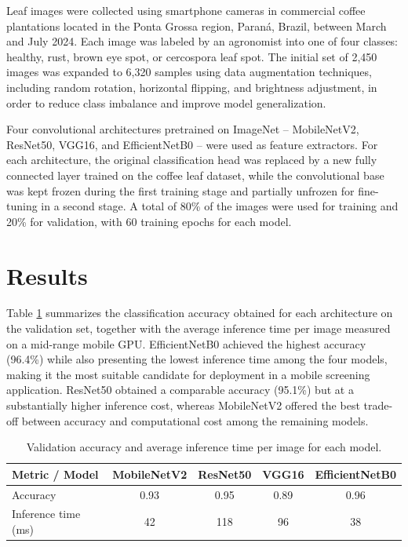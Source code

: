 \documentclass[11pt,a4paper]{article}
\begin{document}
Leaf images were collected using smartphone cameras in commercial
coffee plantations located in the Ponta Grossa region, Paran\'a,
Brazil, between March and July 2024. Each image was labeled by an
agronomist into one of four classes: healthy, rust, brown eye spot, or
cercospora leaf spot. The initial set of 2,450 images was expanded to
6,320 samples using data augmentation techniques, including random
rotation, horizontal flipping, and brightness adjustment, in order to
reduce class imbalance and improve model generalization.

Four convolutional architectures pretrained on ImageNet --
MobileNetV2, ResNet50, VGG16, and EfficientNetB0 -- were used as
feature extractors. For each architecture, the original classification
head was replaced by a new fully connected layer trained on the coffee
leaf dataset, while the convolutional base was kept frozen during the
first training stage and partially unfrozen for fine-tuning in a
second stage. A total of 80\% of the images were used for training and
20\% for validation, with 60 training epochs for each model.

\section{Results}

Table \ref{tab:exemplo} summarizes the classification accuracy obtained
for each architecture on the validation set, together with the average
inference time per image measured on a mid-range mobile GPU.
EfficientNetB0 achieved the highest accuracy (96.4\%) while also
presenting the lowest inference time among the four models, making it
the most suitable candidate for deployment in a mobile screening
application. ResNet50 obtained a comparable accuracy (95.1\%) but at a
substantially higher inference cost, whereas MobileNetV2 offered the
best trade-off between accuracy and computational cost among the
remaining models.

\begin{table}[htb]
  \centering
  \caption{Validation accuracy and average inference time per image for each model.}
  \label{tab:exemplo}
  \begin{tabular}{|l|c|c|c|c|}
    \hline
    \textbf{Metric / Model} & \textbf{MobileNetV2} & \textbf{ResNet50} & \textbf{VGG16} & \textbf{EfficientNetB0} \\
    \hline
    Accuracy & 0.93 & 0.95 & 0.89 & 0.96 \\
    \hline
    Inference time (ms) & 42 & 118 & 96 & 38 \\
    \hline
  \end{tabular}
\end{table}
\end{document}

